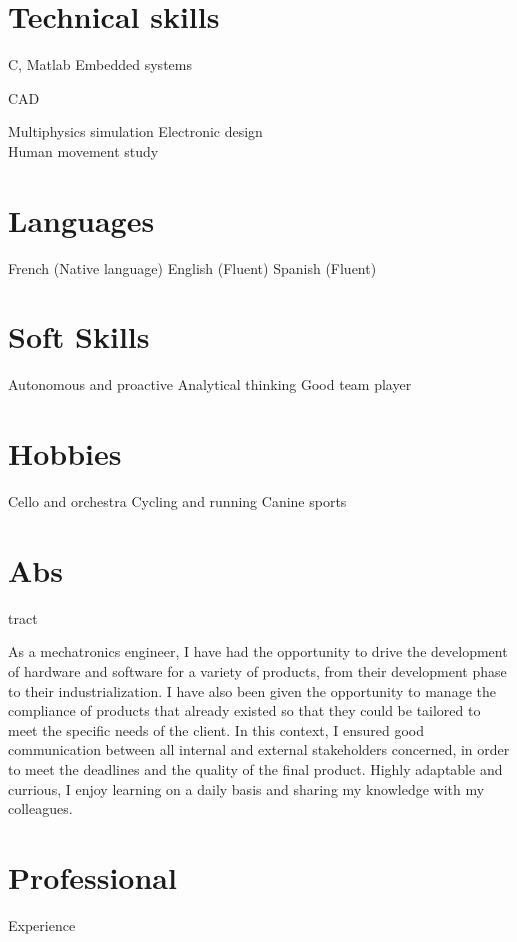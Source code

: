\documentclass{cv-style}     %
\begin{document}
\begin{aside}
    \section{Technical skills}
    C, Matlab
    Embedded systems %

    CAD %

    Multiphysics simulation %
    Electronic design %
    \\Human movement study %
    \section{Languages}
    French (Native language)
    English (Fluent)
    Spanish (Fluent)
    \section{Soft Skills}
    Autonomous and proactive
    Analytical thinking
    Good team player
    \section{Hobbies}
    Cello and orchestra
    Cycling and running
    Canine sports
\end{aside}

\section{Abs}{tract}

As a mechatronics engineer, I have had the opportunity to drive the development of hardware and software for a variety of products,
from their development phase to their industrialization. I have also been given the opportunity to manage the compliance of products
that already existed so that they could be tailored to meet the specific needs of the client.
In this context, I ensured good communication between all internal and external stakeholders concerned,
in order to meet the deadlines and the quality of the final product.
Highly adaptable and currious, I enjoy learning on a daily basis and sharing my knowledge with my colleagues.

\section{Professional }{Experience}
\end{document}
